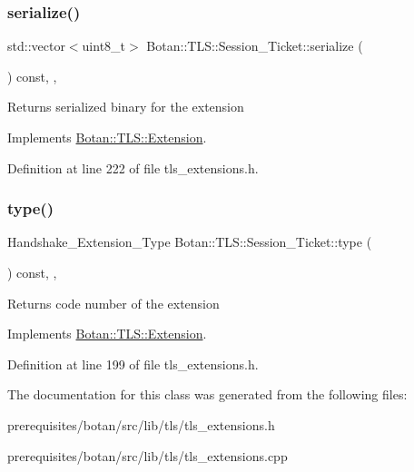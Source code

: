 \subsubsection{\texorpdfstring{serialize()}{serialize()}}
{\footnotesize\ttfamily std\+::vector$<$uint8\+\_\+t$>$ Botan\+::\+T\+L\+S\+::\+Session\+\_\+\+Ticket\+::serialize (\begin{DoxyParamCaption}{ }\end{DoxyParamCaption}) const\hspace{0.3cm}{\ttfamily [inline]}, {\ttfamily [override]}, {\ttfamily [virtual]}}

\begin{DoxyReturn}{Returns}
serialized binary for the extension 
\end{DoxyReturn}


Implements \mbox{\hyperlink{class_botan_1_1_t_l_s_1_1_extension_a56788726ad2526db54e5a26039cb69db}{Botan\+::\+T\+L\+S\+::\+Extension}}.



Definition at line 222 of file tls\+\_\+extensions.\+h.

\mbox{\label{class_botan_1_1_t_l_s_1_1_session___ticket_a0fb84fe33c30d28e0dee120ecc2fe228}} 
\subsubsection{\texorpdfstring{type()}{type()}}
{\footnotesize\ttfamily Handshake\+\_\+\+Extension\+\_\+\+Type Botan\+::\+T\+L\+S\+::\+Session\+\_\+\+Ticket\+::type (\begin{DoxyParamCaption}{ }\end{DoxyParamCaption}) const\hspace{0.3cm}{\ttfamily [inline]}, {\ttfamily [override]}, {\ttfamily [virtual]}}

\begin{DoxyReturn}{Returns}
code number of the extension 
\end{DoxyReturn}


Implements \mbox{\hyperlink{class_botan_1_1_t_l_s_1_1_extension_ac8819b312ce604453225e7b4f7c373ec}{Botan\+::\+T\+L\+S\+::\+Extension}}.



Definition at line 199 of file tls\+\_\+extensions.\+h.



The documentation for this class was generated from the following files\+:\begin{DoxyCompactItemize}
\item 
prerequisites/botan/src/lib/tls/tls\+\_\+extensions.\+h\item 
prerequisites/botan/src/lib/tls/tls\+\_\+extensions.\+cpp\end{DoxyCompactItemize}
